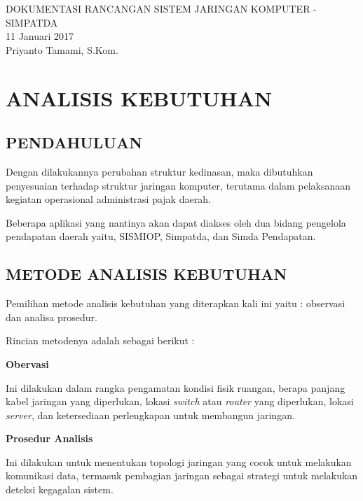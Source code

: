 \documentclass[pdftex,12pt, oneside]{article}
\begin{document}
\sloppy %

\begin{center}
{\large DOKUMENTASI RANCANGAN SISTEM JARINGAN KOMPUTER - SIMPATDA}
\\[1cm]
11 Januari 2017\\
Priyanto Tamami, S.Kom.
\end{center}




\section{ANALISIS KEBUTUHAN}

\subsection{PENDAHULUAN}

Dengan dilakukannya perubahan struktur kedinasan, maka dibutuhkan penyesuaian terhadap struktur jaringan komputer, terutama dalam pelaksanaan kegiatan operasional administrasi pajak daerah. 

Beberapa aplikasi yang nantinya akan dapat diakses oleh dua bidang pengelola pendapatan daerah yaitu, SISMIOP, Simpatda, dan Simda Pendapatan.

\subsection{METODE ANALISIS KEBUTUHAN}

Pemilihan metode analisis kebutuhan yang diterapkan kali ini yaitu : observasi dan analisa prosedur.

Rincian metodenya adalah sebagai berikut :

\textbf{Obervasi}

Ini dilakukan dalam rangka pengamatan kondisi fisik ruangan, berapa panjang kabel jaringan yang diperlukan, lokasi \textit{switch} atau \textit{router} yang diperlukan, lokasi \textit{server}, dan ketersediaan perlengkapan untuk membangun jaringan.

\textbf{Prosedur Analisis}

Ini dilakukan untuk menentukan topologi jaringan yang cocok untuk melakukan komunikasi data, termasuk pembagian jaringan sebagai strategi untuk melakukan deteksi kegagalan sistem.
\end{document}

